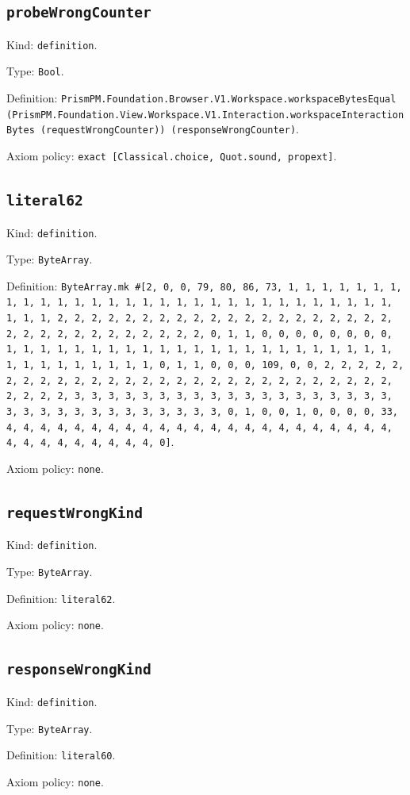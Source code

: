 \documentclass[11pt]{article}
\begin{document}
\subsection*{\texttt{probeWrongCounter}}
\noindent Kind: \texttt{definition}.\par
\noindent Type: \texttt{Bool}.\par
\noindent Definition: \texttt{PrismPM.Foundation.Browser.V1.Workspace.workspaceBytesEqual (PrismPM.Foundation.View.Workspace.V1.Interaction.workspaceInteractionBytes (requestWrongCounter)) (responseWrongCounter)}.\par
\noindent Axiom policy: \texttt{exact [Classical.choice, Quot.sound, propext]}.\par
\subsection*{\texttt{literal62}}
\noindent Kind: \texttt{definition}.\par
\noindent Type: \texttt{ByteArray}.\par
\noindent Definition: \texttt{ByteArray.mk \#[2, 0, 0, 79, 80, 86, 73, 1, 1, 1, 1, 1, 1, 1, 1, 1, 1, 1, 1, 1, 1, 1, 1, 1, 1, 1, 1, 1, 1, 1, 1, 1, 1, 1, 1, 1, 1, 1, 1, 1, 2, 2, 2, 2, 2, 2, 2, 2, 2, 2, 2, 2, 2, 2, 2, 2, 2, 2, 2, 2, 2, 2, 2, 2, 2, 2, 2, 2, 2, 2, 2, 2, 0, 1, 1, 0, 0, 0, 0, 0, 0, 0, 0, 1, 1, 1, 1, 1, 1, 1, 1, 1, 1, 1, 1, 1, 1, 1, 1, 1, 1, 1, 1, 1, 1, 1, 1, 1, 1, 1, 1, 1, 1, 1, 1, 0, 1, 1, 0, 0, 0, 109, 0, 0, 2, 2, 2, 2, 2, 2, 2, 2, 2, 2, 2, 2, 2, 2, 2, 2, 2, 2, 2, 2, 2, 2, 2, 2, 2, 2, 2, 2, 2, 2, 2, 2, 3, 3, 3, 3, 3, 3, 3, 3, 3, 3, 3, 3, 3, 3, 3, 3, 3, 3, 3, 3, 3, 3, 3, 3, 3, 3, 3, 3, 3, 3, 3, 3, 0, 1, 0, 0, 1, 0, 0, 0, 0, 33, 4, 4, 4, 4, 4, 4, 4, 4, 4, 4, 4, 4, 4, 4, 4, 4, 4, 4, 4, 4, 4, 4, 4, 4, 4, 4, 4, 4, 4, 4, 4, 4, 0]}.\par
\noindent Axiom policy: \texttt{none}.\par
\subsection*{\texttt{requestWrongKind}}
\noindent Kind: \texttt{definition}.\par
\noindent Type: \texttt{ByteArray}.\par
\noindent Definition: \texttt{literal62}.\par
\noindent Axiom policy: \texttt{none}.\par
\subsection*{\texttt{responseWrongKind}}
\noindent Kind: \texttt{definition}.\par
\noindent Type: \texttt{ByteArray}.\par
\noindent Definition: \texttt{literal60}.\par
\noindent Axiom policy: \texttt{none}.\par
\end{document}
